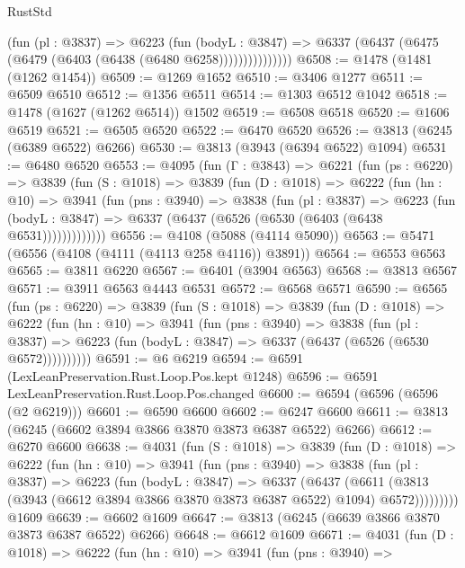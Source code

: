 \begin{lexlean}{RustStd}
\begin{coremodule}
                  (fun (pl : @3837) =>
                  @6223
                    (fun (bodyL : @3847) =>
                    @6337 (@6437 (@6475 (@6479 (@6403 (@6438 (@6480 @6258)))))))))))))))
@6508 := @1478 (@1481 (@1262 @1454))
@6509 := @1269 @1652
@6510 := @3406 @1277
@6511 := @6509 @6510
@6512 := @1356 @6511
@6514 := @1303 @6512 @1042
@6518 := @1478 (@1627 (@1262 @6514)) @1502
@6519 := @6508 @6518
@6520 := @1606 @6519
@6521 := @6505 @6520
@6522 := @6470 @6520
@6526 := @3813 (@6245 (@6389 @6522) @6266)
@6530 := @3813 (@3943 (@6394 @6522) @1094)
@6531 := @6480 @6520
@6553 := @4095
    (fun (Γ : @3843) =>
    @6221
      (fun (ps : @6220) =>
      @3839
        (fun (S : @1018) =>
        @3839
          (fun (D : @1018) =>
          @6222
            (fun (hn : @10) =>
            @3941
              (fun (pns : @3940) =>
              @3838
                (fun (pl : @3837) =>
                @6223
                  (fun (bodyL : @3847) =>
                  @6337 (@6437 (@6526 (@6530 (@6403 (@6438 @6531)))))))))))))
@6556 := @4108 (@5088 (@4114 @5090))
@6563 := @5471 (@6556 (@4108 (@4111 (@4113 @258 @4116)) @3891))
@6564 := @6553 @6563
@6565 := @3811 @6220
@6567 := @6401 (@3904 @6563)
@6568 := @3813 @6567
@6571 := @3911 @6563 @4443 @6531
@6572 := @6568 @6571
@6590 := @6565
    (fun (ps : @6220) =>
    @3839
      (fun (S : @1018) =>
      @3839
        (fun (D : @1018) =>
        @6222
          (fun (hn : @10) =>
          @3941
            (fun (pns : @3940) =>
            @3838
              (fun (pl : @3837) =>
              @6223 (fun (bodyL : @3847) => @6337 (@6437 (@6526 (@6530 @6572))))))))))
@6591 := @6 @6219
@6594 := @6591 (LexLeanPreservation.Rust.Loop.Pos.kept @1248)
@6596 := @6591 LexLeanPreservation.Rust.Loop.Pos.changed
@6600 := @6594 (@6596 (@6596 (@2 @6219)))
@6601 := @6590 @6600
@6602 := @6247 @6600
@6611 := @3813 (@6245 (@6602 @3894 @3866 @3870 @3873 @6387 @6522) @6266)
@6612 := @6270 @6600
@6638 := @4031
    (fun (S : @1018) =>
    @3839
      (fun (D : @1018) =>
      @6222
        (fun (hn : @10) =>
        @3941
          (fun (pns : @3940) =>
          @3838
            (fun (pl : @3837) =>
            @6223
              (fun (bodyL : @3847) =>
              @6337
                (@6437
                  (@6611
                    (@3813 (@3943 (@6612 @3894 @3866 @3870 @3873 @6387 @6522) @1094) @6572)))))))))
    @1609
@6639 := @6602 @1609
@6647 := @3813 (@6245 (@6639 @3866 @3870 @3873 @6387 @6522) @6266)
@6648 := @6612 @1609
@6671 := @4031
    (fun (D : @1018) =>
    @6222
      (fun (hn : @10) =>
      @3941
        (fun (pns : @3940) =>

\end{coremodule}
\end{lexlean}

